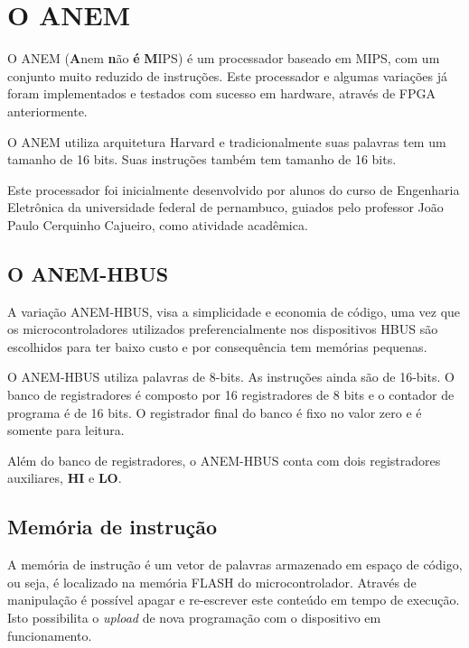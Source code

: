 \documentclass[11pt]{report}
\begin{document}
\section{O ANEM}

O ANEM (\textbf{A}nem \textbf{n}ão \textbf{é} \textbf{M}IPS) é um processador baseado em MIPS, com um conjunto muito reduzido de instruções. Este processador e algumas variações já foram implementados e testados com sucesso em hardware, através de FPGA anteriormente.

O ANEM utiliza arquitetura Harvard e tradicionalmente suas palavras tem um tamanho de 16 bits. Suas instruções também tem tamanho de 16 bits.

Este processador foi inicialmente desenvolvido por alunos do curso de Engenharia Eletrônica da universidade federal de pernambuco, guiados pelo professor João Paulo Cerquinho Cajueiro, como atividade acadêmica.


\subsection{O ANEM-HBUS}

A variação ANEM-HBUS, visa a simplicidade e economia de código, uma vez que os microcontroladores utilizados preferencialmente nos dispositivos HBUS são escolhidos para ter baixo custo e por consequência tem memórias pequenas.

O ANEM-HBUS utiliza palavras de 8-bits. As instruções ainda são de 16-bits. O banco de registradores é composto por 16 registradores de 8 bits e o contador de programa é de 16 bits. O registrador final do banco é fixo no valor zero e é somente para leitura.

Além do banco de registradores, o ANEM-HBUS conta com dois registradores auxiliares, \textbf{HI} e \textbf{LO}.

\subsection{Memória de instrução}

A memória de instrução é um vetor de palavras armazenado em espaço de código, ou seja, é localizado na memória FLASH do microcontrolador. Através de manipulação é possível apagar e re-escrever este conteúdo em tempo de execução. Isto possibilita o \textit{upload} de nova programação com o dispositivo em funcionamento.
\end{document}

